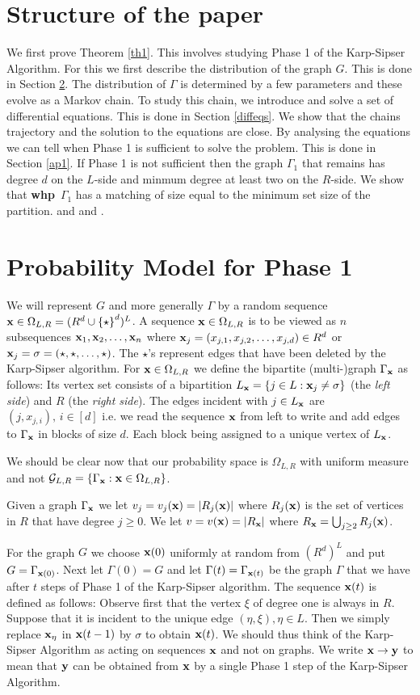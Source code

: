 \documentclass[11pt]{article}
\def\bx{{\bf x}}
\def\by{{\bf y}}
\def\bx{{\bf x}}
\def\G{\Gamma}
\def\s{\sigma}
\def\whp{{\bf whp}}
\newcommand{\set}[1]{\left\{#1\right\}}
\def\cG{{\cal G}}
\begin{document}
\section{Structure of the paper}
We first prove Theorem \ref{th1}. This involves studying Phase 1 of the Karp-Sipser Algorithm. For this we first describe 
the distribution of the graph $G$. This is done in Section \ref{probsec}. The distribution of $\G$ is determined
by a few parameters and these evolve as a Markov chain. To study this chain, we introduce and solve a set of differential
equations. This is done in Section \ref{diffeqs}. We show that the chains trajectory and the solution to the equations are close.
By analysing the equations we can tell when Phase 1 is sufficient to solve the problem. This is done in Section \ref{ap1}.
If Phase 1 is not sufficient then the graph $\G_1$ that remains has degree $d$ on the $L$-side and minmum degree at least two
on the $R$-side. We show that \whp\ $\G_1$ has a matching of size equal to the minimum set size of the partition. 
\cite{DMP} and \cite{DM} and \cite{FP}. 
\section{Probability Model for Phase 1}\label{probsec}
We will represent $G$ and more generally $\G$ by a random sequence $\bx\in \Omega_{L,R}=(R^d\cup\set{\star}^d)^L$. 
A sequence $\bx\in \Omega_{L,R}$ is to be viewed as $n$ subsequences $\bx_1,\bx_2,\ldots,\bx_n$ where $\bx_j=(x_{j,1},x_{j,2},\ldots,
x_{j,d})\in R^d$
or $\bx_j=\s=(\star,\star,\ldots,\star)$. 
The $\star$'s represent edges that have been deleted by the Karp-Sipser algorithm.
For $\bx\in \Omega_{L,R}$ we 
define the bipartite (multi-)graph $\G_\bx$ as follows: Its vertex set consists of a bipartition
$L_\bx=\set{j\in L:\bx_j\neq \s}$ (the {\em left side}) and $R$ (the {\em right side}). The edges incident with $j\in L_\bx$ are 
$(j,x_{j,i}),\,i\in [d]$
i.e. we read the sequence $\bx$ from left to write and add edges to $\G_\bx$ in blocks of size $d$. Each block being
assigned to a unique vertex of $L_\bx$. 

We should be clear now that our probability space is $\Omega_{L,R}$ with uniform measure and not 
$\cG_{L,R}=\set{\G_\bx:\bx\in \Omega_{L,R}}$.

Given a graph
$\G_\bx$ we let $v_j=v_j(\bx)=|R_j(\bx)|$ where $R_j(\bx)$ is the set of vertices in $R$
that have degree $j\geq 0$. We let $v=v(\bx)=|R_\bx|$ where $R_\bx=\bigcup_{j\geq 2}R_j(\bx)$.

For the graph $G$ we choose $\bx(0)$ uniformly at random from $(R^d)^L$ and put $G=\G_{\bx(0)}$. Next
let $\G(0)=G$ and let $\G(t)=\G_{\bx(t)}$ be the graph $\G$ that we have after $t$ 
steps of Phase 1 of the Karp-Sipser algorithm. The sequence $\bx(t)$ is defined as follows: Observe first that
the vertex $\xi$ of degree one is always in $R$. Suppose that it is incident to the unique edge $(\eta,\xi),\eta\in L$. Then
we simply replace $\bx_\eta$ in $\bx(t-1)$ by $\s$ to obtain $\bx(t)$. We should thus think of the Karp-Sipser Algorithm as acting
on sequences $\bx$ and not on graphs. We write $\bx\to\by$ to mean that $\by$ can be obtained from $\bx$ by a single 
Phase 1 step of the Karp-Sipser Algorithm. 
\end{document}
